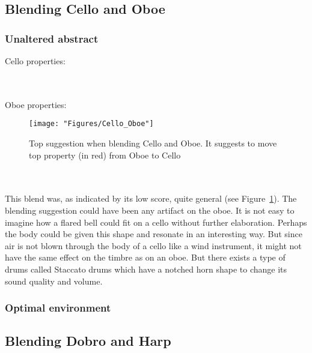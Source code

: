 \subsection{Blending Cello and Oboe}

\subsubsection{Unaltered abstract}

Cello properties:

\noindent{}
\\\\Oboe properties:

\begin{figure} \centering \texttt{[image: "Figures/Cello\_Oboe"]} \caption{Top suggestion when blending Cello and Oboe. It suggests to move top property (in red) from Oboe to Cello } \label{Cello-Oboe} \end{figure}

\noindent{}	
\\\\This blend was, as indicated by its low score, quite general (see Figure~\ref{Cello-Oboe}). The blending suggestion could have been any artifact on the oboe. It is not easy to imagine how a flared bell could fit on a cello without further elaboration. Perhaps the body could be given this shape and resonate in an interesting way. But since air is not blown through the body of a cello like a wind instrument, it might not have the same effect on the timbre as on an oboe. But there exists a type of drums called Staccato drums which have a notched horn shape to change its sound quality and volume.

\subsubsection{Optimal environment}

\subsection{Blending Dobro and Harp }
